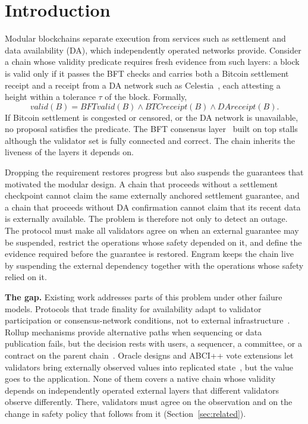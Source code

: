 \section{Introduction}
\label{sec:intro}

Modular blockchains separate execution from services such as settlement and
data availability (DA), which independently operated networks provide. Consider
a chain whose validity predicate requires fresh evidence from such layers: a
block is valid only if it passes the BFT checks and carries both a Bitcoin
settlement receipt and a receipt from a DA network such as
Celestia~\cite{albassam2019lazyledger}, each attesting a height within a
tolerance $\tau$ of the block. Formally,
\[
\mathit{valid}(B) = \mathit{BFTvalid}(B) \wedge \mathit{BTCreceipt}(B)
\wedge \mathit{DAreceipt}(B).
\]
If Bitcoin settlement is congested or censored, or the DA network is
unavailable, no proposal satisfies the predicate. The BFT consensus
layer~\cite{buchman2016tendermint,buchman2018gossip} built on top stalls
although the validator set is fully connected and correct. The chain inherits
the liveness of the layers it depends on.

Dropping the requirement restores progress but also suspends the guarantees
that motivated the modular design. A chain that proceeds without a settlement
checkpoint cannot claim the same externally anchored settlement guarantee, and
a chain that proceeds without DA confirmation cannot claim that its recent
data is externally available. The problem is therefore not only to detect an
outage. The protocol must make all validators agree on when an external
guarantee may be suspended, restrict the operations whose safety depended on
it, and define the evidence required before the guarantee is restored. Engram
keeps the chain live by suspending the external dependency together with the
operations whose safety relied on it.

\textbf{The gap.} Existing work addresses parts of this problem under other
failure models. Protocols that trade finality for availability adapt to
validator participation or consensus-network conditions, not to external
infrastructure~\cite{neu2021ebbflow,buterin2020gasper}. Rollup mechanisms
provide alternative paths when sequencing or data publication fails, but the
decision rests with users, a sequencer, a committee, or a contract on the
parent chain~\cite{figueira2025escapehatch,arbitrum_anytrust,optimism_altda}.
Oracle designs and ABCI++ vote extensions let validators bring externally
observed values into replicated state~\cite{cosmos_adr064,slinky_oracle}, but
the value goes to the application. None of them covers a native chain whose
validity depends on independently operated external layers that different
validators observe differently. There, validators must agree on the observation
and on the change in safety policy that follows from it
(Section~\ref{sec:related}).

